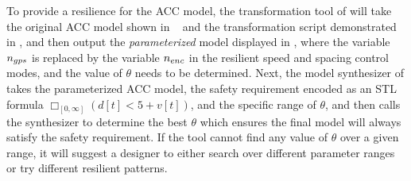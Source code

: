 To provide a resilience for the ACC model, the transformation tool of \toolreaffirm will take the original ACC model shown in ~ and the transformation script demonstrated in , and then output the \emph{parameterized} model displayed in , where the variable $n_{gps}$ is replaced by the variable $n_{enc}$ in the resilient speed and spacing control modes, and the value of $\theta$ needs to be determined. Next, the model synthesizer of \toolreaffirm takes the parameterized ACC model, the safety requirement encoded as an STL formula $\Box_{[0, \infty]} (d[t] < 5 + v[t])$, and the specific range of $\theta$, and then calls the synthesizer to determine the best $\theta$ which ensures the final model will always satisfy the safety requirement. If the tool cannot find any value of $\theta$ over a given range, it will suggest a designer to either search over different parameter ranges or try different resilient patterns.   
%
%

